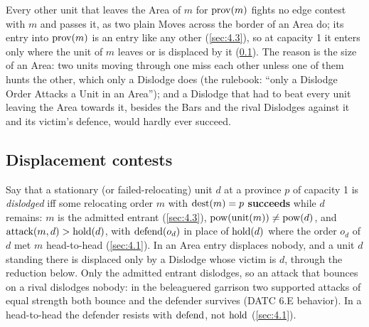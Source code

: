\documentclass[12pt,a4paper]{article}
\begin{document}
Every other unit that leaves the Area of $m$ for $\operatorname{prov}(m)$ fights no edge contest with $m$ and passes it, as two plain Moves across the border of an Area do; its entry into $\operatorname{prov}(m)$ is an entry like any other (\cref{sec:4.3}), so at capacity 1 it enters only where the unit of $m$ leaves or is displaced by it (\cref{sec:4.2}).
The reason is the size of an Area: two units moving through one miss each other unless one of them hunts the other, which only a Dislodge does (the rulebook: ``only a Dislodge Order Attacks a Unit in an Area''); and a Dislodge that had to beat every unit leaving the Area towards it, besides the Bars and the rival Dislodges against it and its victim's defence, would hardly ever succeed.

\subsection{Displacement contests}\label{sec:4.2}

Say that a stationary (or failed-relocating) unit $d$ at a province $p$ of capacity 1 is \emph{dislodged} iff some relocating order $m$ with $\operatorname{dest}(m) = p$ \textbf{succeeds} while $d$ remains: $m$ is the admitted entrant (\cref{sec:4.3}), $\operatorname{pow}(\operatorname{unit}(m)) \ne \operatorname{pow}(d)$, and $\operatorname{attack}(m, d) > \operatorname{hold}(d)$, with $\operatorname{defend}(o_d)$ in place of $\operatorname{hold}(d)$ where the order $o_d$ of $d$ met $m$ head-to-head (\cref{sec:4.1}).
In an Area entry displaces nobody, and a unit $d$ standing there is displaced only by a Dislodge whose victim is $d$, through the reduction below.
Only the admitted entrant dislodges, so an attack that bounces on a rival dislodges nobody: in the beleaguered garrison two supported attacks of equal strength both bounce and the defender survives (DATC 6.E behavior).
In a head-to-head the defender resists with $\operatorname{defend}$, not $\operatorname{hold}$ (\cref{sec:4.1}).
\end{document}
